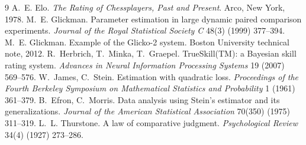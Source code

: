 \documentclass[11pt]{article}
\begin{document}
\begin{thebibliography}{9}
 A.~E. Elo. \emph{The Rating of Chessplayers,
Past and Present}. Arco, New York, 1978.
 M.~E. Glickman. Parameter
estimation in large dynamic paired comparison experiments.
\emph{Journal of the Royal Statistical Society C} 48(3) (1999) 377--394.
 M.~E. Glickman. Example of the
Glicko-2 system. Boston University technical note, 2012.
R.~Herbrich, T.~Minka, T.~Graepel. TrueSkill(TM): a Bayesian skill
rating system. \emph{Advances in Neural Information Processing Systems}
19 (2007) 569--576.
 W.~James, C.~Stein.
Estimation with quadratic loss. \emph{Proceedings of the Fourth Berkeley
Symposium on Mathematical Statistics and Probability} 1 (1961) 361--379.
 B.~Efron, C.~Morris. Data
analysis using Stein's estimator and its generalizations. \emph{Journal
of the American Statistical Association} 70(350) (1975) 311--319.
 L.~L. Thurstone. A law of
comparative judgment. \emph{Psychological Review} 34(4) (1927) 273--286.
\end{thebibliography}
\end{document}
